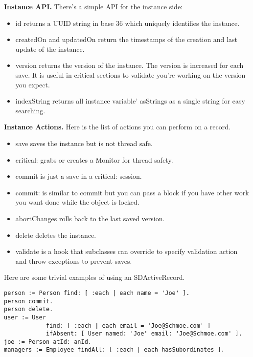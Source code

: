 \documentclass[a4paper,10pt,twoside]{book}
\newcommand{\ct}[1]{{\small\ttfamily\textup{#1}}}
\begin{document}
\textbf{Instance API.} There's a simple API for the instance side: 

\begin{itemize}
\item  \ct{id} returns a UUID string in base 36 which uniquely  identifies the instance.
\item  \ct{createdOn} and \ct{updatedOn} return the timestamps of the  creation and last update of the instance.
\item  \ct{version} returns the version of the instance. The version  is increased for each save. It is useful in critical sections to  validate you're working on the version you expect.
\end{itemize}

\begin{itemize}
\item  \ct{indexString} returns all instance variable' \ct{asString}s as a  single string for easy searching.
\end{itemize}

\textbf{Instance Actions.} Here is the list of actions you can perform on a record.

\begin{itemize}
\item  \ct{save} saves the instance but is not thread safe.
\item  \ct{critical:} grabs or creates a Monitor for thread safety.
\item  \ct{commit} is just a \ct{save} in a \ct{critical:} session.
\item  \ct{commit:} is similar to \ct{commit} but you can pass a block if you have other work you want done while the object is locked.
\item  \ct{abortChanges} rolls back to the last saved version.
\item  \ct{delete} deletes the instance.
\item  \ct{validate} is a hook that subclasses can override to specify validation action and throw exceptions to prevent saves.
\end{itemize}

Here are some trivial examples of using an \ct{SDActiveRecord}. 

\begin{lstlisting}
person := Person find: [ :each | each name = 'Joe' ].
person commit.
person delete.
user := User
            find: [ :each | each email = 'Joe@Schmoe.com' ]
            ifAbsent: [ User named: 'Joe' email: 'Joe@Schmoe.com' ].
joe := Person atId: anId.
managers := Employee findAll: [ :each | each hasSubordinates ].
\end{lstlisting}
\end{document}
